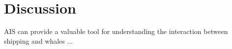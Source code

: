 \section{Discussion}


AIS can provide a valuable tool for understanding the interaction between shipping and whales \cite{Mckenna2012a}...








